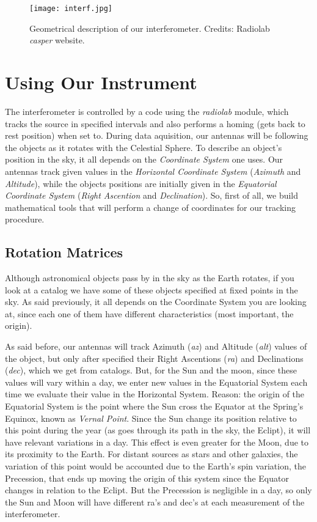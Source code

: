\documentclass{article}
\begin{document}
\begin{figure}[H]
\center
\texttt{[image: interf.jpg]}
\caption {Geometrical description of our interferometer. Credits:
  Radiolab \emph{casper} website.} 
\label{Fig:1}
\end{figure}

\section{Using Our Instrument} 

The interferometer is controlled by a code using the \emph{radiolab}
module, which tracks the source in specified intervals and also 
performs a homing (gets back to rest position)  when set to. During data aquisition, our antennas will be following 
the objects as it rotates with the
Celestial Sphere. To describe an object's
position in the sky, it all depends on the \emph{Coordinate System} one
uses. Our antennas track given values in the \emph{Horizontal Coordinate
System} (\emph{Azimuth} and \emph{Altitude}), while the objects
positions are initially given in the \emph{Equatorial Coordinate System} (\emph{Right Ascention} and \emph{Declination}). So, first of all, we build
mathematical tools that will perform a change of coordinates for our
tracking procedure.

\subsection{Rotation Matrices} 

Although astronomical objects pass by in the sky as the Earth rotates,
if you look at a catalog
we have some of these objects specified at fixed points in the sky. As
said previously, it all depends on the Coordinate System you are looking
at, since each one of them have different characteristics (most
important, the origin). 

As said before, our antennas will track Azimuth (\emph{az}) and
Altitude (\emph{alt}) values of the object, but only after specified
their Right Ascentions (\emph{ra}) and Declinations (\emph{dec}), which
we get from catalogs. But, for the Sun and the moon, since
these values will vary within a day, we enter new values in
the Equatorial System each time we evaluate their value in the
Horizontal System. Reason: the origin of the Equatorial System is the
point where the Sun cross the Equator at the Spring's Equinox, known as
\emph{Vernal Point}. Since the
Sun change its position relative to this point
during the year (as goes through its path in the sky, the Eclipt), 
it will have relevant variations in a
day. This effect is even greater for the Moon, due to its proximity to
the Earth. For distant sources as stars and other galaxies, the variation of
this point would be accounted due to the Earth's spin variation, the
Precession, that ends up moving the origin of this system since the
Equator changes in relation to the Eclipt. But the Precession is
negligible in a day, so only the Sun and Moon will have different ra's
and dec's at each measurement of the interferometer.
\end{document}
